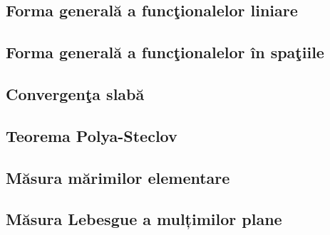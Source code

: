 \documentclass[a4paper,12pt]{article}
\theoremstyle{change}
\begin{document}
\subsection{Forma generală a funcţionalelor liniare}


\subsection{Forma generală a funcţionalelor în spaţiile }


\subsection{Convergenţa slabă}

\subsection{Teorema Polya-Steclov}


\subsection{Măsura mărimilor elementare}

\subsection{Măsura Lebesgue a mulțimilor plane}
\end{document}
